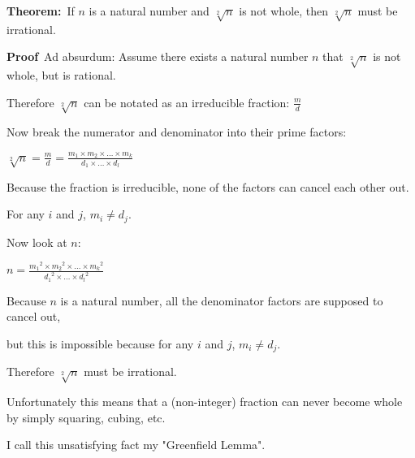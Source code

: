 \documentclass[12pt]{article}
\begin{document}
\textbf{Theorem:}\ If $n$ is a natural number and $\sqrt[2]{n}$ is not whole, then $\sqrt[2]{n}$ must be irrational.

\textbf{Proof}\ Ad absurdum:
Assume there exists a natural number $n$ that $\sqrt[2]{n}$ is not whole, but is rational.

Therefore $\sqrt[2]{n}$ can be notated as an irreducible fraction: $\frac{m}{d}$

Now break the numerator and denominator into their prime factors:

$\sqrt[2]{n} = \frac{m}{d} = \frac{m_1 \times m_2 \times \dots \times m_{k}}{d_1 \times \dots \times d_{l}}$

Because the fraction is irreducible, none of the factors can cancel each other out.

For any $i$ and $j$, $m_i\neq d_j$.

Now look at $n$:

$n = \frac{{m_1}^2 \times {m_2}^2 \times \dots \times {m_k}^2}{{d_1}^2 \times \dots \times {d_l}^2}$

Because $n$ is a natural number, all the denominator factors are supposed to cancel out,

but this is impossible because for any $i$ and $j$, $m_i\neq d_j$.

Therefore $\sqrt[2]{n}$ must be irrational.

Unfortunately this means that a (non-integer) fraction can never become whole by simply squaring, cubing, etc.

I call this unsatisfying fact my "Greenfield Lemma".
\end{document}
